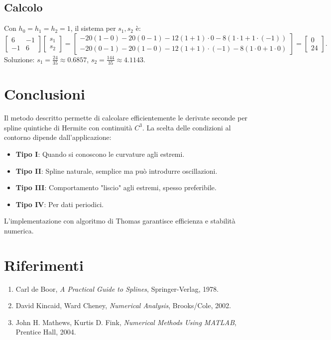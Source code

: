 \documentclass[12pt]{article}
\begin{document}
\subsection{Calcolo}
Con $h_0 = h_1 = h_2 = 1$, il sistema per $s_1, s_2$ è:
\[
\begin{bmatrix}
6 & -1 \\ -1 & 6
\end{bmatrix}
\begin{bmatrix}
s_1 \\ s_2
\end{bmatrix}
=
\begin{bmatrix}
-20(1-0) - 20(0-1) - 12(1+1)\cdot 0 - 8(1\cdot 1 + 1\cdot (-1)) \\
-20(0-1) - 20(1-0) - 12(1+1)\cdot (-1) - 8(1\cdot 0 + 1\cdot 0)
\end{bmatrix}
=
\begin{bmatrix}
0 \\ 24
\end{bmatrix}.
\]
Soluzione: $s_1 = \frac{24}{35} \approx 0.6857$, $s_2 = \frac{144}{35} \approx 4.1143$.

\section{Conclusioni}
Il metodo descritto permette di calcolare efficientemente le derivate seconde per spline quintiche di Hermite con continuità $C^3$. La scelta delle condizioni al contorno dipende dall'applicazione:
\begin{itemize}
\item \textbf{Tipo I}: Quando si conoscono le curvature agli estremi.
\item \textbf{Tipo II}: Spline naturale, semplice ma può introdurre oscillazioni.
\item \textbf{Tipo III}: Comportamento "liscio" agli estremi, spesso preferibile.
\item \textbf{Tipo IV}: Per dati periodici.
\end{itemize}
L'implementazione con algoritmo di Thomas garantisce efficienza e stabilità numerica.

\section*{Riferimenti}
\begin{enumerate}
\item Carl de Boor, \emph{A Practical Guide to Splines}, Springer-Verlag, 1978.
\item David Kincaid, Ward Cheney, \emph{Numerical Analysis}, Brooks/Cole, 2002.
\item John H. Mathews, Kurtis D. Fink, \emph{Numerical Methods Using MATLAB}, Prentice Hall, 2004.
\end{enumerate}
\end{document}
